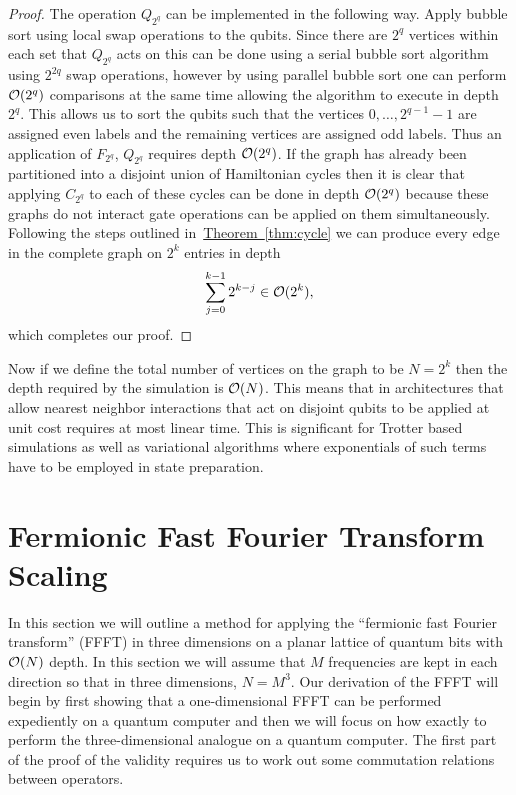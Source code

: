 \documentclass[superscriptaddress,aps,pra,nofootinbib,notitlepage,10pt,longbibliography]{revtex4-1}
\newcommand{\thm}[1]{\hyperref[thm:#1]{Theorem~\ref*{thm:#1}}}
\begin{document}
\begin{proof}
The operation $Q_{2^q}$ can be implemented in the following way.  Apply bubble sort using local swap operations to the qubits.  Since there are $2^{q}$ vertices within each set that $Q_{2^q}$ acts on this can be done using a serial bubble sort algorithm using $2^{2q}$ swap operations, however by using parallel bubble sort one can perform ${\cal O}(2^{q})$ comparisons at the same time allowing the algorithm to execute in depth $2^{q}$.  This allows us to sort the qubits such that the vertices $0,\ldots, 2^{q-1}-1$ are assigned even labels and the remaining vertices are assigned odd labels.  Thus an application of $F_{2^q}$, $Q_{2^q}$ requires depth ${\cal O}(2^{q})$.
If the graph has already been partitioned into a disjoint union of Hamiltonian cycles then it is clear that applying $C_{2^q}$ to each of these cycles can be done in depth ${\cal O}(2^{q})$ because these graphs do not interact  gate operations can be applied on them simultaneously. Following the steps outlined in~\thm{cycle} we can produce every edge in the complete graph on $2^{k}$ entries in depth
$$
\sum_{j=0}^{k-1} 2^{k-j} \in {\cal O}(2^{k}),
$$
which completes our proof.
\end{proof}

Now if we define the total number of vertices on the graph to be $N=2^{k}$ then the depth required by the simulation is ${\cal O}(N)$.  This means that in architectures that allow nearest neighbor interactions that act on disjoint qubits to be applied at unit cost requires at most linear time.  This is significant for Trotter based simulations as well as variational algorithms where exponentials of such terms have to be employed in state preparation.


\section{Fermionic Fast Fourier Transform Scaling}
\label{app:fqft}

In this section we will outline a method for applying the ``fermionic fast Fourier transform'' (FFFT) in three dimensions on a planar lattice of quantum bits with ${\cal O}(N)$ depth. In this section we will assume that $M$ frequencies are kept in each direction so that in three dimensions, $N = M^3$. Our derivation of the FFFT will begin by first showing that a one-dimensional FFFT can be performed expediently on a quantum computer and then we will focus on how exactly to perform the three-dimensional analogue on a quantum computer. The first part of the proof of the validity requires us to work out some commutation relations between operators.
\end{document}
